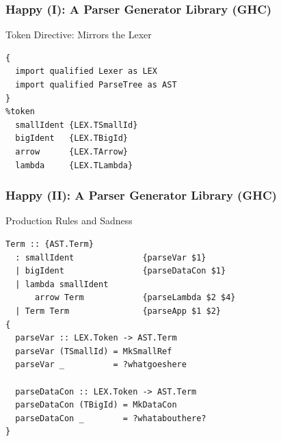 \documentclass
  [hyperref={colorlinks = true,linkcolor = blue, 
             citecolor = blue, urlcolor = blue}
  ]{beamer}
\begin{document}
\begin{frame}[fragile]
\frametitle{Happy (I): A Parser Generator Library (GHC)}
\begin{block}{Token Directive: Mirrors the Lexer}
\begin{verbatim}
{
  import qualified Lexer as LEX
  import qualified ParseTree as AST
}
%token
  smallIdent {LEX.TSmallId}
  bigIdent   {LEX.TBigId}
  arrow      {LEX.TArrow}
  lambda     {LEX.TLambda}
\end{verbatim}
\end{block}
\end{frame}

\begin{frame}[fragile]
\frametitle{Happy (II): A Parser Generator Library (GHC)}
\begin{block}{Production Rules and Sadness}
\begin{verbatim}
Term :: {AST.Term}
  : smallIdent              {parseVar $1}
  | bigIdent                {parseDataCon $1}
  | lambda smallIdent
      arrow Term            {parseLambda $2 $4}
  | Term Term               {parseApp $1 $2}
{
  parseVar :: LEX.Token -> AST.Term
  parseVar (TSmallId) = MkSmallRef
  parseVar _          = ?whatgoeshere

  parseDataCon :: LEX.Token -> AST.Term
  parseDataCon (TBigId) = MkDataCon
  parseDataCon _        = ?whatabouthere?
}
\end{verbatim}
\end{block}
\end{frame}
\end{document}
